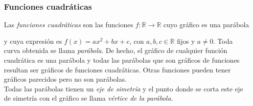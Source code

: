\documentclass[Análisis.root.tex]{subfiles}
\newcommand{\R}{\mathbb{R}}
\begin{document}
    \subsubsection{Funciones cuadráticas}
    Las \textit{funciones cuadráticas} son las funciones \(f: \R \rightarrow \R\) cuyo gráfico es una parábola
    \begin{center}
    \end{center}
    y cuya expresión es \(f(x)=ax^2+bx+c\), con \(a,b,c\in\R\) fijos y \(a\neq0\).
    Toda curva obtenida se llama \textit{parábola}. De hecho, el gráfico de cualquier función cuadrática es una parábola y todas las parábolas que son gráficos de funciones resultan ser gráficos de funciones cuadráticas. Otras funciones pueden tener gráficos parecidos pero no son parábolas.\\
    Todas las parábolas tienen un \textit{eje de simetría} y el punto donde se corta este eje de simetría con el gráfico se llama \textit{vértice de la parábola}.
\end{document}
